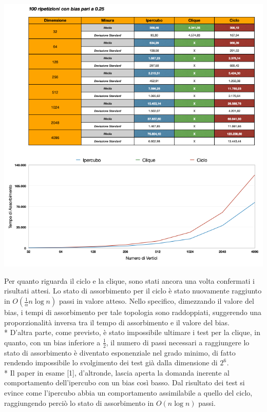 \documentclass{article}
\begin{document}
\begin{center}
\includegraphics[width=1\textwidth]{test_bias025.png}
\end{center}
Per quanto riguarda il ciclo e la clique, sono stati ancora una volta confermati i risultati attesi.
Lo stato di assorbimento per il ciclo è stato nuovamente raggiunto in $O(\frac{1}{\alpha}n\log{}n)$ passi in valore atteso. Nello specifico, dimezzando il valore del bias, i tempi di assorbimento per tale topologia sono raddoppiati, suggerendo una proporzionalità inversa tra il tempo di assorbimento e il valore del bias.\\*
D'altra parte, come previsto, è stato impossibile ultimare i test per la clique, in quanto, con un bias inferiore a $\frac{1}{2}$, il numero di passi necessari a raggiungere lo stato di assorbimento è diventato esponenziale nel grado minimo, di fatto rendendo impossibile lo svolgimento dei test già dalla dimensione di $2^{6^{\mathrm{}}}$.\\*
Il paper in esame [1], d'altronde, lascia aperta la domanda inerente al comportamento dell'ipercubo con un bias così basso. Dal risultato dei test si evince come l'ipercubo abbia un comportamento assimilabile a quello del ciclo, raggiungendo perciò lo stato di assorbimento in $O(n\log{}n)$ passi.
\end{document}
